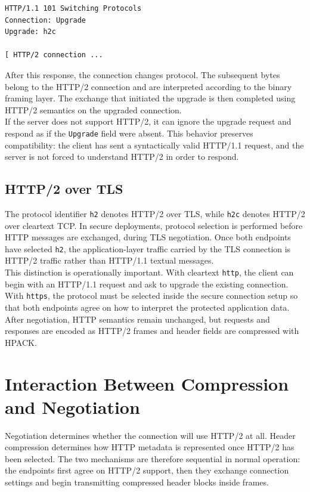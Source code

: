 \documentclass{scrbook}
\begin{document}
\begin{lstlisting}
HTTP/1.1 101 Switching Protocols
Connection: Upgrade
Upgrade: h2c

[ HTTP/2 connection ...
\end{lstlisting}

After this response, the connection changes protocol. The subsequent bytes belong to the HTTP/2 connection and are interpreted according to the binary framing layer. The exchange that initiated the upgrade is then completed using HTTP/2 semantics on the upgraded connection.\\

If the server does not support HTTP/2, it can ignore the upgrade request and respond as if the \texttt{Upgrade} field were absent. This behavior preserves compatibility: the client has sent a syntactically valid HTTP/1.1 request, and the server is not forced to understand HTTP/2 in order to respond.

\subsection{HTTP/2 over TLS}

The protocol identifier \texttt{h2} denotes HTTP/2 over TLS, while \texttt{h2c} denotes HTTP/2 over cleartext TCP. In secure deployments, protocol selection is performed before HTTP messages are exchanged, during TLS negotiation. Once both endpoints have selected \texttt{h2}, the application-layer traffic carried by the TLS connection is HTTP/2 traffic rather than HTTP/1.1 textual messages.\\

This distinction is operationally important. With cleartext \texttt{http}, the client can begin with an HTTP/1.1 request and ask to upgrade the existing connection. With \texttt{https}, the protocol must be selected inside the secure connection setup so that both endpoints agree on how to interpret the protected application data. After negotiation, HTTP semantics remain unchanged, but requests and responses are encoded as HTTP/2 frames and header fields are compressed with HPACK.

\section{Interaction Between Compression and Negotiation}

Negotiation determines whether the connection will use HTTP/2 at all. Header compression determines how HTTP metadata is represented once HTTP/2 has been selected. The two mechanisms are therefore sequential in normal operation: the endpoints first agree on HTTP/2 support, then they exchange connection settings and begin transmitting compressed header blocks inside frames.\\
\end{document}
